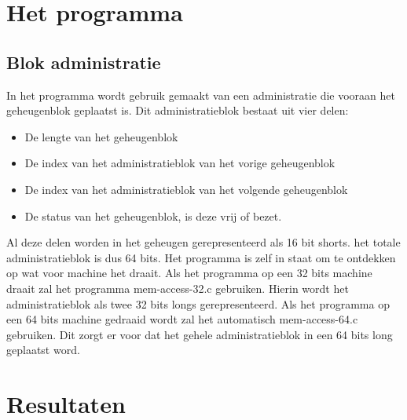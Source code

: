 \documentclass[11pt]{article}
\begin{document}
	\section{Het programma}\label{sec:programma}
		\subsection{Blok administratie}
		In het programma wordt gebruik gemaakt van een administratie die vooraan het geheugenblok geplaatst is. Dit administratieblok bestaat uit vier delen:
		\begin{itemize}
			\item De lengte van het geheugenblok
			\item De index van het administratieblok van het vorige geheugenblok
			\item De index van het administratieblok van het volgende geheugenblok
			\item De status van het geheugenblok, is deze vrij of bezet.
		\end{itemize}
		Al deze delen worden in het geheugen gerepresenteerd als 16 bit shorts. het totale administratieblok is dus 64 bits.
		Het programma is zelf in staat om te ontdekken op wat voor machine het draait.
		Als het programma op een 32 bits machine draait zal het programma mem-access-32.c gebruiken.
		Hierin wordt het administratieblok als twee 32 bits longs gerepresenteerd.
		Als het programma op een 64 bits machine gedraaid wordt zal het automatisch mem-access-64.c gebruiken.
		Dit zorgt er voor dat het gehele administratieblok in een 64 bits long geplaatst word.
		
	\section{Resultaten}\label{sec:resultaten}
\end{document}
